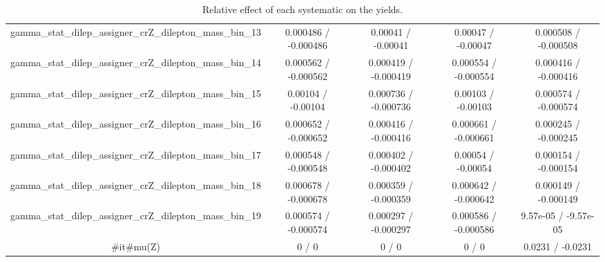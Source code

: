 \documentclass[10pt]{article}
\begin{document}
\begin{table}[htbp]
\begin{center}
\begin{tabular}{|c|c|c|c|c|}
  gamma_stat_dilep_assigner_crZ_dilepton_mass_bin_13 & 0.000486 / -0.000486 & 0.00041 / -0.00041 & 0.00047 / -0.00047 & 0.000508 / -0.000508 \\ 
  gamma_stat_dilep_assigner_crZ_dilepton_mass_bin_14 & 0.000562 / -0.000562 & 0.000419 / -0.000419 & 0.000554 / -0.000554 & 0.000416 / -0.000416 \\ 
  gamma_stat_dilep_assigner_crZ_dilepton_mass_bin_15 & 0.00104 / -0.00104 & 0.000736 / -0.000736 & 0.00103 / -0.00103 & 0.000574 / -0.000574 \\ 
  gamma_stat_dilep_assigner_crZ_dilepton_mass_bin_16 & 0.000652 / -0.000652 & 0.000416 / -0.000416 & 0.000661 / -0.000661 & 0.000245 / -0.000245 \\ 
  gamma_stat_dilep_assigner_crZ_dilepton_mass_bin_17 & 0.000548 / -0.000548 & 0.000402 / -0.000402 & 0.00054 / -0.00054 & 0.000154 / -0.000154 \\ 
  gamma_stat_dilep_assigner_crZ_dilepton_mass_bin_18 & 0.000678 / -0.000678 & 0.000359 / -0.000359 & 0.000642 / -0.000642 & 0.000149 / -0.000149 \\ 
  gamma_stat_dilep_assigner_crZ_dilepton_mass_bin_19 & 0.000574 / -0.000574 & 0.000297 / -0.000297 & 0.000586 / -0.000586 & 9.57e-05 / -9.57e-05 \\ 
  #it{#mu}(Z) & 0 / 0 & 0 / 0 & 0 / 0 & 0.0231 / -0.0231 \\ 
\hline 
\end{tabular} 
\caption{Relative effect of each systematic on the yields.} 
\end{center} 
\end{table} 
\end{document}
